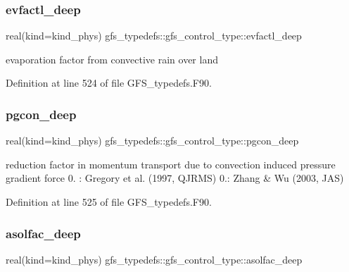 \mbox{\label{structgfs__typedefs_1_1gfs__control__type_a0bfb968581670046204db105bf97ec76}} 
\subsubsection{evfactl\+\_\+deep}
{\footnotesize\ttfamily real(kind=kind\+\_\+phys) gfs\+\_\+typedefs\+::gfs\+\_\+control\+\_\+type\+::evfactl\+\_\+deep}



evaporation factor from convective rain over land 



Definition at line 524 of file G\+F\+S\+\_\+typedefs.\+F90.

\mbox{\label{structgfs__typedefs_1_1gfs__control__type_ad34c7c57d3724a2e57a7bb84417ffb0b}} 
\subsubsection{pgcon\+\_\+deep}
{\footnotesize\ttfamily real(kind=kind\+\_\+phys) gfs\+\_\+typedefs\+::gfs\+\_\+control\+\_\+type\+::pgcon\+\_\+deep}



reduction factor in momentum transport due to convection induced pressure gradient force 0. \+: Gregory et al. (1997, Q\+J\+R\+MS) 0.\+: Zhang \& Wu (2003, J\+AS) 



Definition at line 525 of file G\+F\+S\+\_\+typedefs.\+F90.

\mbox{\label{structgfs__typedefs_1_1gfs__control__type_a821e7620bd3b5abf627f4cf64a2e00aa}} 
\subsubsection{asolfac\+\_\+deep}
{\footnotesize\ttfamily real(kind=kind\+\_\+phys) gfs\+\_\+typedefs\+::gfs\+\_\+control\+\_\+type\+::asolfac\+\_\+deep}



